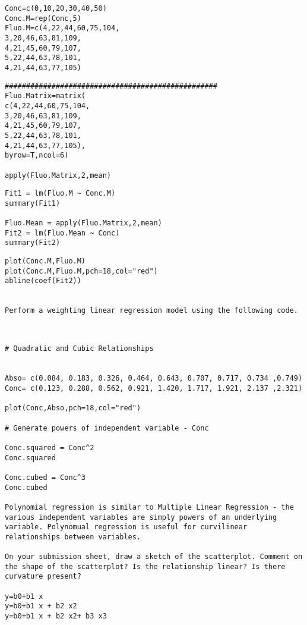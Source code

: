 \begin{verbatim}
Conc=c(0,10,20,30,40,50)
Conc.M=rep(Conc,5)
Fluo.M=c(4,22,44,60,75,104,
3,20,46,63,81,109,
4,21,45,60,79,107,
5,22,44,63,78,101,
4,21,44,63,77,105)
\end{verbatim}
\begin{verbatim}
##################################################
Fluo.Matrix=matrix(
c(4,22,44,60,75,104,
3,20,46,63,81,109,
4,21,45,60,79,107,
5,22,44,63,78,101,
4,21,44,63,77,105),
byrow=T,ncol=6)

apply(Fluo.Matrix,2,mean)
\end{verbatim}
\begin{verbatim}
Fit1 = lm(Fluo.M ~ Conc.M)
summary(Fit1)

Fluo.Mean = apply(Fluo.Matrix,2,mean)
Fit2 = lm(Fluo.Mean ~ Conc)
summary(Fit2)
\end{verbatim}
\begin{verbatim}
plot(Conc.M,Fluo.M)
plot(Conc.M,Fluo.M,pch=18,col="red")
abline(coef(Fit2))


Perform a weighting linear regression model using the following code.
\end{verbatim}
\begin{verbatim}


# Quadratic and Cubic Relationships


Abso= c(0.084, 0.183, 0.326, 0.464, 0.643, 0.707, 0.717, 0.734 ,0.749)
Conc= c(0.123, 0.288, 0.562, 0.921, 1.420, 1.717, 1.921, 2.137 ,2.321)

plot(Conc,Abso,pch=18,col="red")

# Generate powers of independent variable - Conc

Conc.squared = Conc^2
Conc.squared

Conc.cubed = Conc^3
Conc.cubed

Polynomial regression is similar to Multiple Linear Regression - the various independent variables are simply powers of an underlying variable. Polynomual regression is useful for curvilinear relationships between variables.

On your submission sheet, draw a sketch of the scatterplot. Comment on the shape of the scatterplot? Is the relationship linear? Is there curvature present?

y=b0+b1 x 
y=b0+b1 x + b2 x2
y=b0+b1 x + b2 x2+ b3 x3

\end{verbatim}
